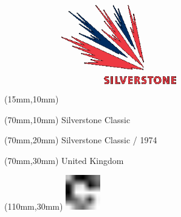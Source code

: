\null\newpage
\begin{textblock*}{50mm}(15mm,10mm)%
\includegraphics[width=50mm]{LG/SIL.png}
\end{textblock*}
\begin{textblock*}{130mm}(70mm,10mm)%
{\fontsize{20}{20}\selectfont Silverstone Classic}\\
\end{textblock*}
\begin{textblock*}{120mm}(70mm,20mm)%
{\fontsize{16}{16}\selectfont Silverstone Classic / 1974}\\
\end{textblock*}
\begin{textblock*}{120mm}(70mm,30mm)%
{\fontsize{12}{12}\selectfont United Kingdom}
\end{textblock*}
\begin{textblock*}{30mm}(110mm,30mm)%
\centering
\includegraphics[height=15mm]{icons/fa-rotate-right.pdf}
\end{textblock*}
